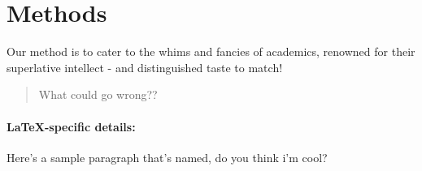 \section{Methods}

Our method is to cater to the whims and fancies of academics, renowned for their superlative intellect - and distinguished taste to match!
\begin{quote}
What could go wrong??
\end{quote}

\paragraph{\LaTeX-specific details:}
Here's a sample paragraph that's named, do you think i'm cool?